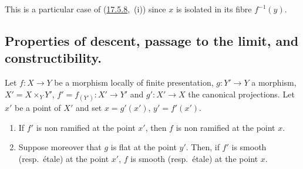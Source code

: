 This is a particular case of ({\hyperlink{ega4.c04.prop.17-5-8}{17.5.8}},~(i)) since $x$ is isolated in its fibre $f^{-1}(y)$.


\subsection{Properties of descent, passage to the limit, and constructibility.}
\label{subsection:IV.17.7}
\label{IV.17.7}


\begin{proposition}[17.7.1]
\label{IV.17.7.1}
Let $f:X\to Y$ be a morphism locally of finite presentation, $g:Y'\to Y$ a morphism, $X'=X\times_Y Y'$, $f'=f_{(Y')}:X'\to Y'$ and $g':X'\to X$ the canonical projections.
Let $x'$ be a point of $X'$ and set $x=g'(x')$, $y'=f'(x')$.
\begin{enumerate}[label=(\roman*)]
  \item If $f'$ is non ramified at the point $x'$, then $f$ is non ramified at the point $x$.
  \item Suppose moreover that $g$ is flat at the point $y'$.
  Then, if $f'$ is smooth (resp.\ \'etale) at the point $x'$, $f$ is smooth (resp.\ \'etale) at the point $x$.
\end{enumerate}
\end{proposition}

